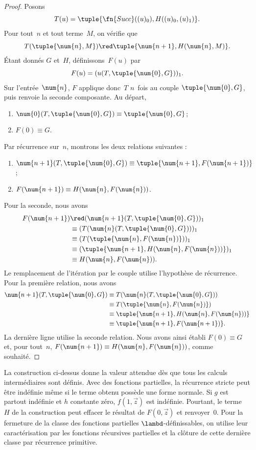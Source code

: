 \documentclass[../../../include/open-logic-section]{subfiles}
\begin{document}
\begin{proof}
Posons
\[
T(u)=\tuple{\fn{Succ}((u)_0),H((u)_0,(u)_1)}.
\]
Pour tout~$n$ et tout terme~$M$, on vérifie que
\[
T(\tuple{\num{n},M})
\red\tuple{\num{n+1},H(\num{n},M)}.
\]
Étant donnés $G$ et~$H$, définissons~$F(u)$ par
\[
F(u)=(u(T,\tuple{\num{0},G}))_1.
\]
Sur l'entrée~$\num{n}$, $F$ applique donc~$T$
$n$~fois au couple $\tuple{\num{0},G}$, puis
renvoie la seconde composante. Au départ,
\begin{enumerate}
\item $\num{0}(T,\tuple{\num{0},G})
  \equiv\tuple{\num{0},G}$;
\item $F(\num{0})\equiv G$.
\end{enumerate}
Par récurrence sur~$n$, montrons les deux
relations suivantes :
\begin{enumerate}
\item $\num{n+1}(T,\tuple{\num{0},G})
  \equiv\tuple{\num{n+1},F(\num{n+1})}$;
\item $F(\num{n+1})
  \equiv H(\num{n},F(\num{n}))$.
\end{enumerate}
Pour la seconde, nous avons
\begin{align*}
F(\num{n+1})
&\red(\num{n+1}(T,\tuple{\num{0},G}))_1 \\
&\equiv(T(\num{n}(T,\tuple{\num{0},G})))_1 \\
&\equiv(T(\tuple{\num{n},F(\num{n})}))_1 \\
&\equiv(\tuple{\num{n+1},H(\num{n},F(\num{n}))})_1 \\
&\equiv H(\num{n},F(\num{n})).
\end{align*}
Le remplacement de l'itération par le couple utilise
l'hypothèse de récurrence. Pour la première
relation, nous avons
\begin{align*}
\num{n+1}(T,\tuple{\num{0},G})
&\equiv T(\num{n}(T,\tuple{\num{0},G})) \\
&\equiv T(\tuple{\num{n},F(\num{n})}) \\
&\equiv\tuple{\num{n+1},H(\num{n},F(\num{n}))} \\
&\equiv\tuple{\num{n+1},F(\num{n+1})}.
\end{align*}
La dernière ligne utilise la seconde relation.
Nous avons ainsi établi $F(\num{0})\equiv G$
et, pour tout~$n$,
$F(\num{n+1})\equiv H(\num{n},F(\num{n}))$,
comme souhaité.
\end{proof}

La construction ci-dessus donne la valeur attendue dès que tous
les calculs intermédiaires sont définis. Avec des fonctions
partielles, la récurrence stricte peut être indéfinie même si le
terme obtenu possède une forme normale. Si $g$ est partout
indéfinie et $h$ constante zéro, $f(1,\vec z)$ est indéfinie.
Pourtant, le terme~$H$ de la construction peut effacer le résultat
de $F(\num{0},\vec z)$ et renvoyer~$\num{0}$.
Pour la fermeture de la classe des fonctions partielles
$\lambd$-définissables, on utilise leur caractérisation par les
fonctions récursives partielles et la clôture de cette dernière
classe par récurrence primitive.
\end{document}
